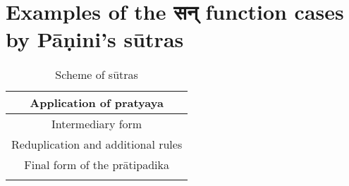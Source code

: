 \section{Examples of the \texthindi{सन्} function cases by Pāṇini’s sūtras}

		\begin{longtable}{ |c| } 
			\hline
			\rowcolor{blue!10}
			Application of pratyaya
			\\\hline
			\rowcolor{red!10}
			Intermediary form
			\\\hline
			\rowcolor{yellow!10}
			Reduplication and additional rules
			\\\hline
			\rowcolor{green!10}
			Final form of the  prātipadika 
			\\\hline
		
		\caption{Scheme of sūtras}
		\label{table:a15}
		\end{longtable}

